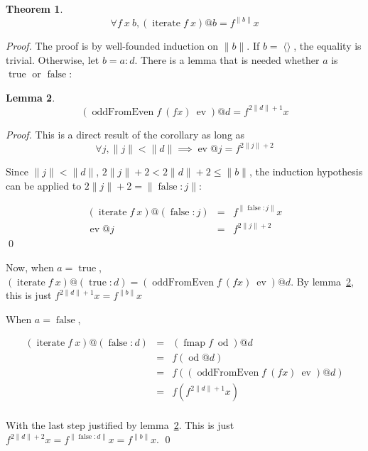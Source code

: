 \documentclass[envcountsect]{llncs}
\DeclareMathOperator{\oddFrom}{oddFromEven}
\DeclareMathOperator{\nil}{\langle\rangle}
\DeclareMathOperator{\true}{true}
\DeclareMathOperator{\false}{false}
\DeclareMathOperator{\fmap}{fmap}
\DeclareMathOperator{\iter}{iterate}
\newcommand{\ord}[1]{\|#1\|}
\newcommand{\cons}[2]{#1:#2}
\DeclareMathOperator{\ev}{ev}
\DeclareMathOperator{\od}{od}
\newtheorem{theorem}{Theorem}
\newtheorem{lemma}[theorem]{Lemma}
\begin{document}
\begin{theorem}\label{iterateCorrect}
\begin{displaymath}
\forall f\ x\ b, (\iter f\ x)@b = f^{\ord{b}} x
\end{displaymath}
\end{theorem}
\begin{proof}

The proof is by well-founded induction on $\ord{b}$.
If $b = \nil$, the equality is trivial.
Otherwise, let $b = \cons{a}{d}$.
There is a lemma that is needed whether $a$ is $\true$ or $\false$:

\begin{lemma}\label{iterateSublemma}
\begin{displaymath}
(\oddFrom f\ (f x)\ \ev)@d = f^{2\ord{d}+1}x
\end{displaymath}
\end{lemma}
\begin{proof}
This is a direct result of the corollary as long as 
\begin{displaymath}
\forall j, \ord{j} < \ord{d} \implies \ev @j = f^{2\ord{j}+2}
\end{displaymath}

Since $\ord{j} < \ord{d}$, $2\ord{j}+2 < 2\ord{d}+2 \leq \ord{b}$, the induction hypothesis can be applied to $2\ord{j}+2 = \ord{\cons{\false}{j}}$:

\begin{displaymath}
\begin{array}{rcl}
(\iter f\ x)@(\cons{\false}{j}) & = & f^{\ord{\cons{\false}{j}}} x \\
\ev @j & = & f^{2\ord{j}+2}
\end{array}
\end{displaymath}
\qed
\end{proof}

Now, when $a = \true$, $(\iter f\ x)@(\cons{\true}{d}) = (\oddFrom f\ (f x)\ \ev)@d$.
By lemma~\ref{iterateSublemma}, this is just $f^{2\ord{d}+1}x = f^{\ord{b}}x$

When $a = \false$, 

\begin{displaymath}
\begin{array}{rcl}
(\iter f\ x)@(\cons{\false}{d}) & = & (\fmap f\ \od)@d \\
& = & f(\od @d) \\
& = & f((\oddFrom f\ (f x)\ \ev)@d) \\
& = & f(f^{2\ord{d}+1}x) \\
\end{array}
\end{displaymath}

With the last step justified by lemma~\ref{iterateSublemma}. This is just $f^{2\ord{d}+2}x = f^{\ord{\cons{\false}{d}}}x = f^{\ord{b}}x$.
\qed
\end{proof}
\end{document}

